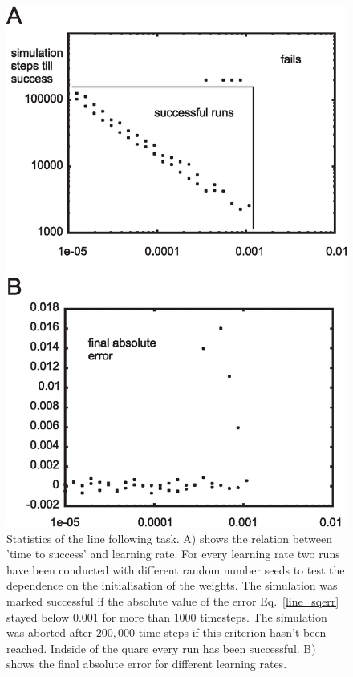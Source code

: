 \documentclass{aamas2018}
\begin{document}
\begin{figure}[!ht]
  \centering
  \includegraphics[width=\columnwidth]{line_stats}
  \caption{Statistics of the line following task. A) shows the relation between
    'time to success' and learning rate. For every learning rate two runs have
    been conducted with different random number seeds to test the dependence on the
    initialisation of the weights. The simulation was marked successful if the
    absolute value of the error Eq.~\ref{line_sqerr} stayed below $0.001$ for more than $1000$
    timesteps. The simulation was aborted after $200,000$ time steps if this criterion
    hasn't been reached. Indside of the quare every run has been successful.
    B) shows the final absolute error for different learning rates.
    \label{line_stats}}
\end{figure}
\end{document}

